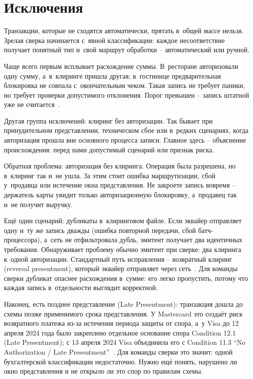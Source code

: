 \section{Исключения}\label{sec:recon-exceptions}

Транзакции, которые не сходятся автоматически, прятать в~общей
массе нельзя. Зрелая сверка начинается с~явной классификации: каждое несоответствие
получает понятный тип и~свой маршрут обработки -- автоматический
или ручной.

Чаще всего первым всплывает расхождение суммы. В~ресторане
авторизовали одну сумму, а~в~клиринге пришла другая; в~гостинице
предварительная блокировка не совпала с~окончательным чеком. Такая
запись не требует паники, но требует проверки допустимого отклонения.
Порог превышен -- запись штатной уже не считается~\cite{visa-core-rules}.

Другая группа исключений: клиринг без авторизации. Так бывает при
принудительном представлении, техническом сбое или в~редких сценариях,
когда авторизация прошла вне основного процесса записи. Главное здесь --
объяснение происхождения: перед нами допустимый сценарий
или признак риска.

Обратная проблема: авторизация без клиринга. Операция была разрешена,
но в~клиринг так и~не ушла. За этим стоит ошибка маршрутизации,
сбой у~продавца или истечение окна представления. Не закроете запись
вовремя -- держатель карты увидит только авторизационную
блокировку, а~продавец так и~не получит выручку.

Ещё один сценарий: дубликаты в~клиринговом файле. Если
эквайер отправляет одну и~ту же запись дважды (ошибка
повторной передачи, сбой батч-процессора), а~сеть не
отфильтровала дубль, эмитент получает два идентичных
требования. Обнаруживает проблему обычно эмитент при сверке:
два клиринга к~одной авторизации. Стандартный путь
исправления -- возвратный клиринг (reversal presentment),
который эквайер отправляет через сеть~\cite{visa-core-rules}.
Для команды сверки дубликат опаснее расхождения в~сумме:
его легко пропустить, потому что каждая запись в~отдельности
выглядит корректной.

Наконец, есть позднее представление (Late Presentment): транзакция
дошла до схемы позже применимого срока представления. У
Mastercard это создаёт риск возвратного платежа из-за истечения периода защиты
от спора, а~у Visa до 12 апреля 2024 года было закреплено отдельное
основание спора Condition 12.1 (Late Presentment); с 13 апреля 2024
Visa объединила его с Condition 11.3 \enquote{No Authorization /
Late Presentment}~\cite{mc-tpr,visa-core-rules}. Для команды сверки это
значит: одной бухгалтерской классификации недостаточно. Нужно
ещё понять, нарушено ли окно представления и не открыло ли это спор по
правилам схемы.

